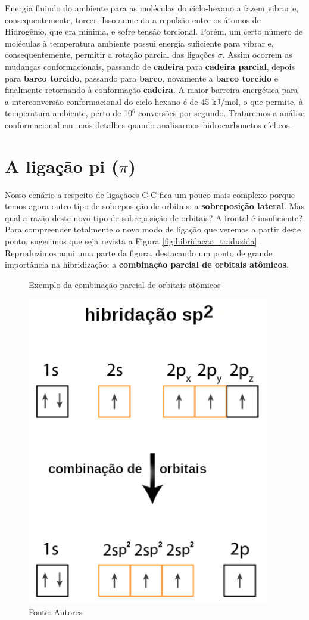 Energia fluindo do ambiente para as moléculas do ciclo-hexano a fazem vibrar e, consequentemente, torcer. Isso aumenta a repulsão entre os átomos de Hidrogênio, que era mínima, e sofre tensão torcional. Porém, um certo número de moléculas à temperatura ambiente possui energia suficiente para vibrar e, consequentemente, permitir a rotação parcial das ligações $\sigma$. Assim ocorrem as mudanças conformacionais, passando de \textbf{cadeira} para \textbf{cadeira parcial}, depois para \textbf{barco torcido}, passando para \textbf{barco}, novamente a \textbf{barco torcido} e finalmente retornando à conformação \textbf{cadeira}. A maior barreira energética para a interconversão conformacional do ciclo-hexano é de 45 kJ/mol, o que permite, à temperatura ambiente, perto de 10$^6$ conversões por segundo. Trataremos a análise conformacional em mais detalhes quando analisarmos hidrocarbonetos cíclicos.

\section{A ligação pi ($\pi$)}
Nosso cenário a respeito de ligaçãoes C-C fica um pouco mais complexo porque temos agora outro tipo de sobreposição de orbitais: a \textbf{sobreposição lateral}. Mas qual a razão deste novo tipo de sobreposição de orbitais? A frontal é insuficiente? Para compreender totalmente o novo modo de ligação que veremos a partir deste ponto, sugerimos que seja revista a Figura \ref{fig:hibridacao_traduzida}. Reproduzimos aqui uma parte da figura, destacando um ponto de grande importância na hibridização: a \textbf{combinação parcial de orbitais atômicos}.

\begin{figure}[h]
\centering
\caption{Exemplo da combinação parcial de orbitais atômicos}
\vspace{0.25cm}
\label{fig:}
\includegraphics[width=0.45\linewidth]{imagens/sp2.png}
\caption*{Fonte: Autores}
\end{figure}

